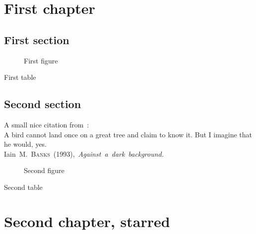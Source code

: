 \documentclass[12pt,a4paper]{report}
\begin{document}
\dominitoc
\dominilof
\dominilot
\tableofcontents
\mtcaddchapter
\listoffigures
\mtcaddchapter
\listoftables
\mtcaddchapter
\chapter{First chapter}
\minitoc
\mtcskip
\minilof
\mtcskip
\minilot
\section{First section}

\begin{figure}[tp]
\caption{First figure}
\end{figure}
\begin{table}[tp]
\caption{First table}
\end{table}

\section{Second section}
A small nice citation from~\cite{dark}:\\
%
%
%
%
%
%
\textsf{A bird cannot land once on a great tree and claim to know it.
But I imagine that he would, yes.}\\
\hbox{}\hfill
Iain~M.~\textsc{Banks}~(1993),~\textsl{Against~a~dark~background.}%

\begin{figure}[tp]
\caption{Second figure}
\end{figure}
\begin{table}
\caption{Second table}
\end{table}
\chapter*{Second chapter, starred}
\end{document}
